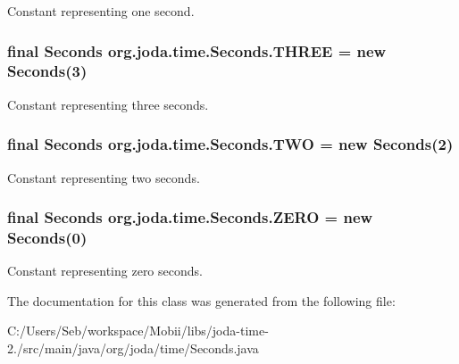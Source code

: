 Constant representing one second. \hypertarget{classorg_1_1joda_1_1time_1_1_seconds_ac4bc1b0c2199733a0328bf16556fd159}{
\subsubsection[{T\-H\-R\-E\-E}]{\setlength{\rightskip}{0pt plus 5cm}final {\bf Seconds} org.\-joda.\-time.\-Seconds.\-T\-H\-R\-E\-E = new {\bf Seconds}(3)\hspace{0.3cm}{\ttfamily [static]}}}\label{classorg_1_1joda_1_1time_1_1_seconds_ac4bc1b0c2199733a0328bf16556fd159}
Constant representing three seconds. \hypertarget{classorg_1_1joda_1_1time_1_1_seconds_a321d84ae2c435142ebff7067643cfe99}{
\subsubsection[{T\-W\-O}]{\setlength{\rightskip}{0pt plus 5cm}final {\bf Seconds} org.\-joda.\-time.\-Seconds.\-T\-W\-O = new {\bf Seconds}(2)\hspace{0.3cm}{\ttfamily [static]}}}\label{classorg_1_1joda_1_1time_1_1_seconds_a321d84ae2c435142ebff7067643cfe99}
Constant representing two seconds. \hypertarget{classorg_1_1joda_1_1time_1_1_seconds_ac79413781a6567541fa8394c05436371}{
\subsubsection[{Z\-E\-R\-O}]{\setlength{\rightskip}{0pt plus 5cm}final {\bf Seconds} org.\-joda.\-time.\-Seconds.\-Z\-E\-R\-O = new {\bf Seconds}(0)\hspace{0.3cm}{\ttfamily [static]}}}\label{classorg_1_1joda_1_1time_1_1_seconds_ac79413781a6567541fa8394c05436371}
Constant representing zero seconds. 

The documentation for this class was generated from the following file\-:\begin{DoxyCompactItemize}
\item 
C\-:/\-Users/\-Seb/workspace/\-Mobii/libs/joda-\/time-\/2./src/main/java/org/joda/time/Seconds.\-java\end{DoxyCompactItemize}

